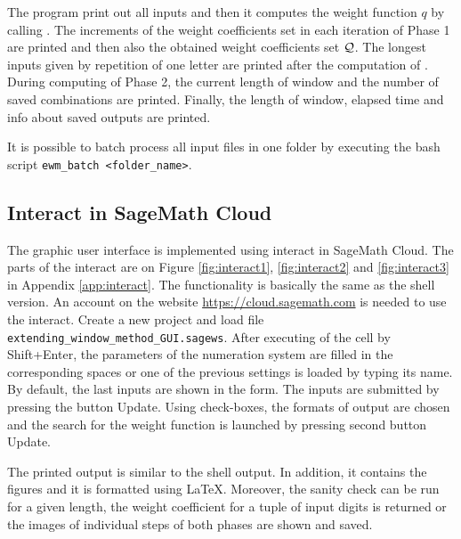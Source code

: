The program print out all inputs and then it computes the weight function $q$ by calling . The increments of the weight coefficients set in each iteration of Phase 1 are printed and then also the obtained weight coefficients set $\mathcal{Q}$. The longest inputs given by repetition of one letter are printed after the computation of . During computing of Phase 2, the current length of window and the number of saved combinations are printed. Finally, the length of window, elapsed time and info about saved outputs are printed.  

It is possible to batch process all input files in one folder by executing the bash script \verb+ewm_batch <folder_name>+.  

\subsection{Interact in SageMath Cloud}
The graphic user interface is implemented using interact in SageMath Cloud. The parts of the interact are on Figure \ref{fig:interact1}, \ref{fig:interact2} and \ref{fig:interact3} in Appendix \ref{app:interact}. The functionality is basically the same as the shell version. An account on the website \url{https://cloud.sagemath.com} is needed to use the interact. Create a new project and load file \verb+extending_window_method_GUI.sagews+. After executing of the cell by Shift+Enter, the parameters of the numeration system are filled in the corresponding spaces or one of the previous settings is loaded by typing its name.  By default, the last inputs are shown in the form. The inputs are submitted by pressing the button Update. Using check-boxes, the formats of output are chosen and the search for the weight function is launched by pressing second button Update.

The printed output is similar to the shell output. In addition, it contains the figures and it is formatted using \LaTeX. Moreover, the sanity check can be run for a given length, the weight coefficient for a tuple of  input digits is returned or the images of individual steps of both phases are shown and saved.